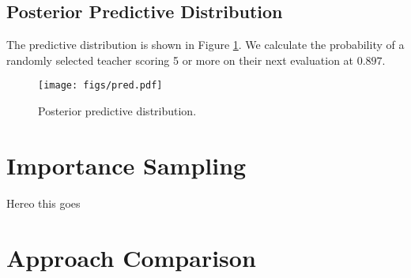 \documentclass[12pt]{article}
\begin{document}
\subsection{Posterior Predictive Distribution}

\noindent The predictive distribution is shown in Figure \ref{prediction}. We calculate the probability of a randomly selected teacher scoring 5 or more on their next evaluation at $0.897$.

\begin{figure}
    \begin{center}
    \texttt{[image: figs/pred.pdf]}
    \end{center}
    \caption{Posterior predictive distribution.}
    \label{prediction}
\end{figure}

\section{Importance Sampling}

\noindent Hereo this goes

\section{Approach Comparison}
\end{document}
